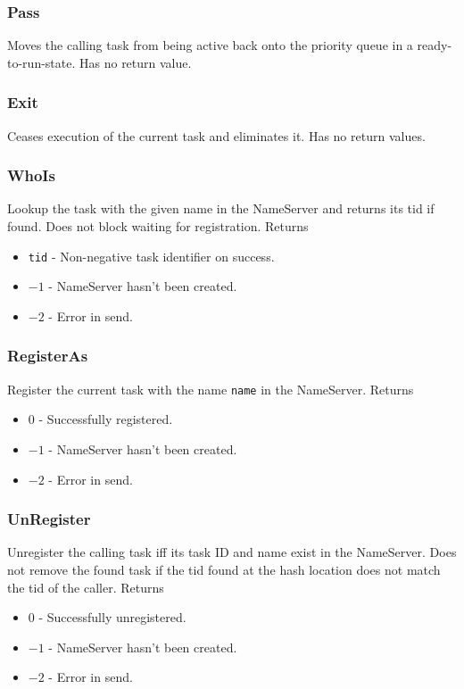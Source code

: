 \documentclass[12pt]{article}
\begin{document}
\subsubsection{Pass}
Moves the calling task from being active back onto the priority queue in a ready-to-run-state.  Has no return value.
\\
\subsubsection{Exit}
Ceases execution of the current task and eliminates it.  Has no return values.
\\
\subsubsection{WhoIs}
Lookup the task with the given name in the NameServer and returns its tid if found.  Does not block waiting for registration.  Returns
\begin{itemize}
  \item \texttt{tid} - Non-negative task identifier on success.
  \item $-1$ - NameServer hasn't been created.
  \item $-2$ - Error  in send.
    \\
\end{itemize}
\subsubsection{RegisterAs}
Register the current task with the name \texttt{name} in the NameServer.  Returns
\begin{itemize}
  \item $0$ - Successfully registered.
  \item $-1$ - NameServer hasn't been created.
  \item $-2$ - Error  in send.
    \\
\end{itemize}
\subsubsection{UnRegister}
Unregister the calling task iff its task ID and name exist in the NameServer.  Does not remove the found task if the tid found at the hash location does not match the tid of the caller.  Returns
\begin{itemize}
  \item $0$ - Successfully unregistered.
  \item $-1$ - NameServer hasn't been created.
  \item $-2$ - Error  in send.
    \\
\end{itemize}
\end{document}

